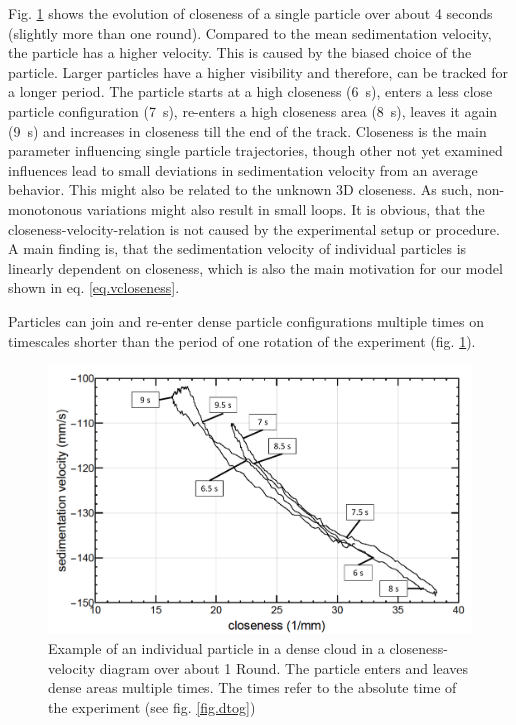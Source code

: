 Fig. \ref{fig.track2} shows the evolution of closeness of {a} single particle over about 4 seconds (slightly more than one round). Compared to the mean sedimentation velocity, the particle has a higher velocity. This is caused by the biased choice of the particle. Larger particles have a higher visibility and therefore, can be tracked for a longer period. 
The particle starts at a high closeness (6~s), enters a less close particle configuration (7~s), re-enters a high closeness area (8~s), leaves it again (9~s) and increases in closeness till the end of the track.
{Closeness is the main parameter influencing single particle trajectories, though other not yet examined influences lead to small deviations in sedimentation velocity from an average behavior.  This might also be related to the unknown 3D closeness. As such, non-monotonous variations might also result in small loops.} It is obvious, that the {closeness-velocity-relation} is not caused by the experimental setup or procedure.
{A main finding is, that the sedimentation velocity of individual particles is linearly dependent on closeness, which is also the main motivation for our model shown in eq. \ref{eq.vcloseness}.} 


Particles can join and {re-enter} dense particle configurations multiple times on timescales shorter than the period of one rotation of the experiment (fig. \ref{fig.track2}). 

\begin{figure}[h]
\includegraphics[width=\columnwidth]{single_Track.pdf}
    \caption{\label{fig.track2} {Example of an individual particle in a dense cloud in a closeness-velocity diagram over about 1 Round. The particle enters and leaves dense areas multiple times. The times refer to the absolute time of the experiment (see fig. \ref{fig.dtog})}}
\end{figure}

